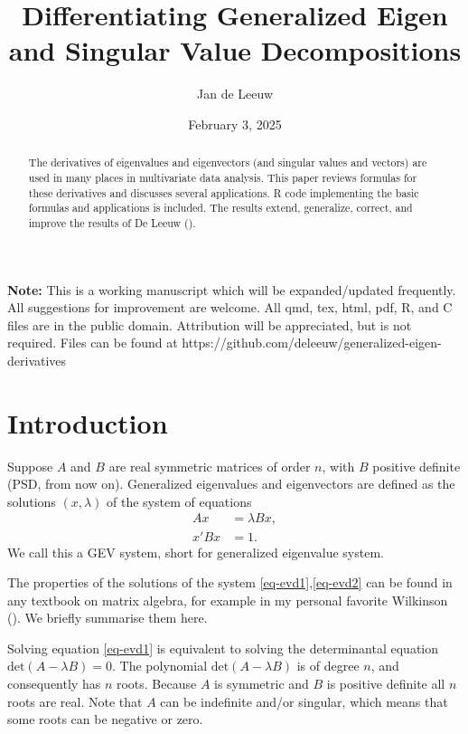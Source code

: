 \documentclass[
  12pt,
  letterpaper,
  DIV=11,
  numbers=noendperiod]{scrartcl}
\title{Differentiating Generalized Eigen and Singular Value
Decompositions}
\author{Jan de Leeuw}
\date{February 3, 2025}
\newcommand{\sectionbreak}{\clearpage}
\renewcommand*\contentsname{Table of contents}
\newcommand\contentsname{Table of contents}
\begin{document}
\maketitle
\begin{abstract}
The derivatives of eigenvalues and eigenvectors (and singular values and
vectors) are used in many places in multivariate data analysis. This
paper reviews formulas for these derivatives and discusses several
applications. R code implementing the basic formulas and applications is
included. The results extend, generalize, correct, and improve the
results of De Leeuw ().
\end{abstract}

\renewcommand*\contentsname{Table of contents}
{
\hypersetup{linkcolor=}
\setcounter{tocdepth}{3}
\tableofcontents
}

\sectionbreak

\textbf{Note:} This is a working manuscript which will be
expanded/updated frequently. All suggestions for improvement are
welcome. All qmd, tex, html, pdf, R, and C files are in the public
domain. Attribution will be appreciated, but is not required. Files can
be found at https://github.com/deleeuw/generalized-eigen-derivatives

\sectionbreak

\section{Introduction}\label{sec-intro}

Suppose \(A\) and \(B\) are real symmetric matrices of order \(n\), with
\(B\) positive definite (PSD, from now on). Generalized eigenvalues and
eigenvectors are defined as the solutions \((x,\lambda)\) of the system
of equations \begin{subequations}
\begin{align}
Ax&=\lambda Bx,\label{eq-evd1}\\
x'Bx&=1.\label{eq-evd2}
\end{align}
\end{subequations} We call this a GEV system, short for generalized
eigenvalue system.

The properties of the solutions of the system
\eqref{eq-evd1},\eqref{eq-evd2} can be found in any textbook on matrix
algebra, for example in my personal favorite Wilkinson
(). We briefly summarise them here.

Solving equation \eqref{eq-evd1} is equivalent to solving the
determinantal equation \(\text{det}(A-\lambda B)=0\). The polynomial
\(\text{det}(A-\lambda B)\) is of degree \(n\), and consequently has
\(n\) roots. Because \(A\) is symmetric and \(B\) is positive definite
all \(n\) roots are real. Note that \(A\) can be indefinite and/or
singular, which means that some roots can be negative or zero.
\end{document}
